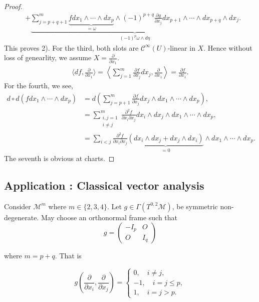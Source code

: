\documentclass[8pt]{article}
\newcommand{\M}[0]{\mathcal{M}}
\newcommand{\cinf}[0]{\mathcal{C}^\infty}
\newcommand{\pd}[2]{{\frac {\partial #1} {\partial #2}}}
\begin{document}
\begin{proof}
\begin{align*}
  & + \underbrace{\sum_{j=p+q+1}^m \underbrace{fdx_1\wedge\cdots \wedge dx_p}_{=\omega}\wedge (-1)^{p+q}\pd{g}{x_j}dx_{p+1}\wedge\cdots\wedge dx_{p+q}\wedge dx_j}_{(-1)^p\omega\wedge d\eta}. 
\end{align*}
This proves 2). For the third, both slots are $\cinf(U)$-linear in $X$. Hence without loss of genearlity, we assume $X = \pd{}{x_1}$.
\begin{align*}
  \langle df,\pd{}{x_1}\rangle = \left\langle\sum_{j=1}^m\pd{f}{x_j}dx_j,\pd{}{x_1}\right\rangle = \pd{f}{x_1}.
\end{align*}
For the fourth, we see,
\begin{align*}
  d\circ d (fdx_1\wedge\cdots\wedge dx_p) & = d\left(\sum_{j=p+1}^m\pd{f}{x_j}dx_j\wedge dx_1\wedge\cdots\wedge dx_p\right),\\
  & = \sum_{\substack{i,j=1\\ i\not=j}}^m {\frac {\partial^2 f}{\partial x_i\partial x_j}}dx_i\wedge dx_j\wedge dx_1\wedge\cdots\wedge dx_{p},\\
  & = \sum_{i<j}{\frac {\partial^2 f} {\partial x_i\partial x_j}}\underbrace{(dx_i\wedge dx_j+dx_j\wedge dx_i)}_{=0}\wedge dx_1\wedge\cdots\wedge dx_p.
\end{align*}
The seventh is obvious at charts.
\end{proof}

\subsection{Application : Classical vector analysis}
Consider $\M^m$ where $m\in\{2,3,4\}$. Let $g\in\Gamma(T^{0,2}\M)$, be symmetric non-degenerate. May choose an orthonormal frame such that 
\begin{equation*}
  g = \begin{pmatrix}
    -I_p & O\\
    O & I_q
  \end{pmatrix}
\end{equation*}

where $m=p+q$. That is 

\begin{equation*}
  g\left(\pd{}{x_i},\pd{}{x_j}\right) =
  \begin{cases}
    0,\quad i\not=j,\\
    -1,\quad i=j\leq p,\\
    1, \quad i=j>p.
  \end{cases}
\end{equation*}
\end{document}

